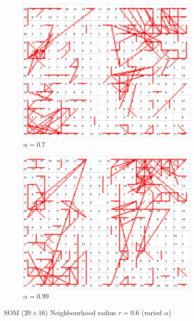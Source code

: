 \documentclass{acm_proc_article-sp}
\begin{document}
\begin{figure}
\begin{subfigure}[b]{0.24\linewidth}
        \label{fig:wine-20x16-neighbourhood-graph-r-06-alpha-0,45}
    \end{subfigure}
    \begin{subfigure}[b]{0.24\linewidth}
        \includegraphics[width=\linewidth]{img/wine-20x16-neighbourhood-graph-r-06-alpha-0,7}
        \caption{$\alpha=0.7$}
        \label{fig:wine-20x16-neighbourhood-graph-r-06-alpha-0,7}
    \end{subfigure}
    \begin{subfigure}[b]{0.24\linewidth}
        \includegraphics[width=\linewidth]{img/wine-20x16-neighbourhood-graph-r-06-alpha-0,99}
        \caption{$\alpha=0.99$}
        \label{fig:wine-20x16-neighbourhood-graph-r-06-alpha-0,99}
    \end{subfigure}
    \caption{SOM ($20\times16$) Neighbourhood radius $r=0.6$ (varied $\alpha$)}
    \label{fig:wine-20x16-neighbourhood-graph-r-06-alpha}
\end{figure}
\end{document}
